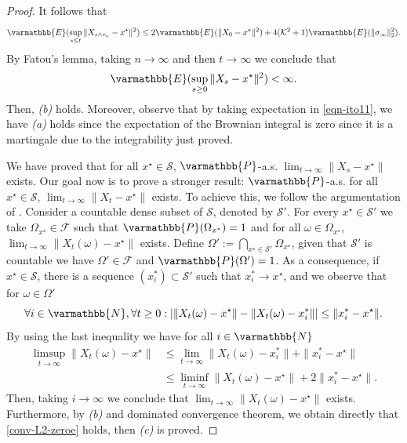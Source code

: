 \documentclass[11pt,reqno]{article}
\let\mathbb=\varmathbb
\newcommand{\N}{\mathbb{N}}
\newcommand{\1}{\mathds{1}}
\numberwithin{equation}{section}  %
\theoremstyle{plain}
\theoremstyle{definition}
\theoremstyle{remark}
\numberwithin{theorem}{section}
\numberwithin{remark}{section}
\numberwithin{example}{section}
\begin{document}
\begin{proof}
    It follows that 
    \begin{equation*}
        \mathbb{E}(\sup_{s\leq t}\|X_{s\wedge \tau_n}-x^\star\|^2) \leq 2\mathbb{E}(\|X_0-x^\star\|^2) +4( \mathcal{K}^2+ 1)\mathbb{E}(\|\sigma_\infty\|_2^2).
    \end{equation*}
    By Fatou's lemma, taking $n\to\infty$ and then $t\to \infty$ we conclude that
    \begin{equation*}
        \mathbb{E}(\sup_{s\geq 0}\|X_s-x^\star\|^2)<\infty.
    \end{equation*}
    Then, \emph{(b)} holds. Moreover, observe that by taking expectation in \eqref{eqn-ito11}, we have \emph{(a)} holds since the expectation of the Brownian integral is zero since it is a martingale due to the integrability just proved. 
    
    We have proved that for all $x^\star\in \mathcal{S}$, $\mathbb{P}$-a.s. $\lim_{t\to \infty}\|X_s-x^\star\|$ exists. Our goal now is to prove a stronger result: $\mathbb{P}$-a.s. for all $x^\star\in \mathcal{S}$, $\displaystyle\lim_{t\to \infty}\|X_t-x^\star\|$ exists. To achieve this, we follow the argumentation of \cite{MR3361444}. Consider a countable dense subset of $\mathcal{S}$, denoted by $\mathcal{S}'$. For every $x^\star\in \mathcal{S}'$ we take $\Omega_{x^\star}\in \mathcal{F}$ such that $\mathbb{P}(\Omega_{x^\star}) = 1$ and for all $\omega \in \Omega_{x^\star}$, $\displaystyle\lim_{t\to \infty}\|X_t(\omega)-x^\star\|$ exists. Define $\Omega' := \bigcap_{x^\star\in \mathcal{S}'}\Omega_{x^\star}$, given that $\mathcal{S}'$ is countable we have $\Omega'\in \mathcal{F}$ and $\mathbb{P}(\Omega') = 1$. As a consequence, if $x^\star\in \mathcal{S}$, there is a sequence $(x_i^\ast)\subset\mathcal{S}'$ such that $x_i^\ast\to x^\star$, and we observe that for $\omega\in \Omega'$
    \begin{equation*}
    	\forall i\in \N, \forall t\geq 0 : \left|\|X_t(\omega)-x^\star\|-\|X_t(\omega)-x_i^\ast\|\right|\leq \|x_i^\ast-x^\star\|.
    \end{equation*}
    By using the last inequality we have for all $i\in \N$
    \begin{equation*}
    	\begin{aligned}
    		\limsup_{t\to \infty}\|X_t(\omega)-x^\star\|&\leq \lim_{t\to \infty}\|X_t(\omega)-x_i^\ast\|+\|x_i^\ast-x^\star\|\\
    		&\leq \liminf_{t\to \infty}\|X_t(\omega)-x^\star\|+2\|x_i^\ast-x^\star\|.
    	\end{aligned}
    \end{equation*}
    Then, taking $i\to \infty$ we conclude that $\displaystyle\lim_{t\to \infty}\|X_t(\omega)-x^\star\|$ exists. Furthermore, by \emph{(b)} and dominated convergence theorem, we obtain directly that \eqref{conv-L2-zeroe} holds, then \emph{(c)} is proved.
    

\end{proof}
\end{document}
